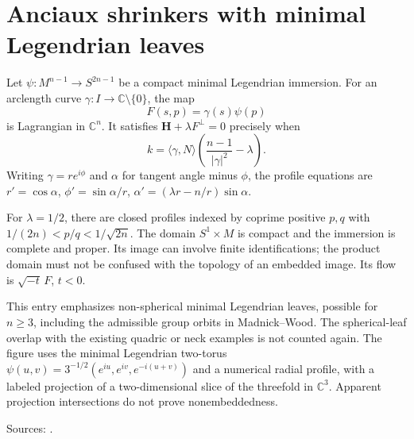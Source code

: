 \chapter{Anciaux shrinkers with minimal Legendrian leaves}\label{sec:catalogue-anciaux-legendrian-shrinkers}
\begin{example}\label{ex:catalogue-anciaux-legendrian-shrinkers}
Let $\psi:M^{n-1}\to S^{2n-1}$ be a compact minimal Legendrian immersion. For an arclength curve $\gamma:I\to\mathbb C\setminus\{0\}$, the map
\[
 F(s,p)=\gamma(s)\psi(p)
\]
is Lagrangian in $\mathbb C^n$. It satisfies $\mathbf H+\lambda F^\perp=0$ precisely when
\[
 k=\langle\gamma,N\rangle\left(\frac{n-1}{|\gamma|^2}-\lambda\right).
\]
Writing $\gamma=re^{i\phi}$ and $\alpha$ for tangent angle minus $\phi$, the profile equations are $r'=\cos\alpha$, $\phi'=\sin\alpha/r$, $\alpha'=(\lambda r-n/r)\sin\alpha$.

For $\lambda=1/2$, there are closed profiles indexed by coprime positive $p,q$ with $1/(2n)<p/q<1/\sqrt{2n}$. The domain $S^1\times M$ is compact and the immersion is complete and proper. Its image can involve finite identifications; the product domain must not be confused with the topology of an embedded image. Its flow is $\sqrt{-t}\,F$, $t<0$.

This entry emphasizes non-spherical minimal Legendrian leaves, possible for $n\ge3$, including the admissible group orbits in Madnick--Wood. The spherical-leaf overlap with the existing quadric or neck examples is not counted again. The figure uses the minimal Legendrian two-torus $\psi(u,v)=3^{-1/2}(e^{iu},e^{iv},e^{-i(u+v)})$ and a numerical radial profile, with a labeled projection of a two-dimensional slice of the threefold in $\mathbb C^3$. Apparent projection intersections do not prove nonembeddedness.
\par Sources: \cite{CatAnciaux2006,CatMadnickWood2025}.
\end{example}

